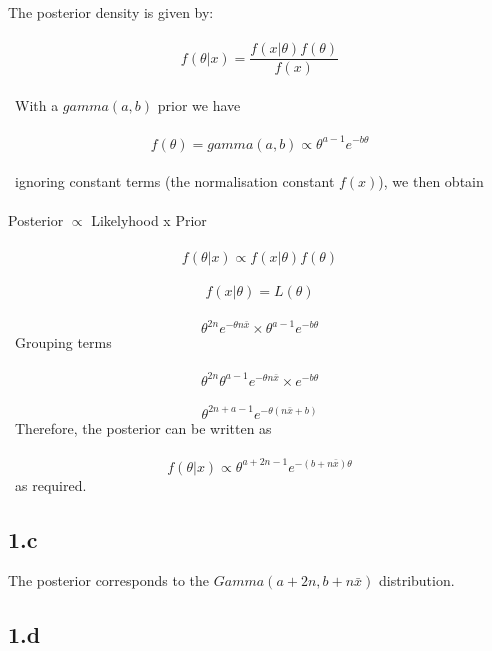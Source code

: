 \documentclass[11pt]{article}   	%
\begin{document}
The posterior density is given by: \\
\
\[ f( \theta | x ) = \frac { f( x | \theta ) f( \theta ) } { f(x) } \] \\
\
With a $ gamma(a, b) $ prior we have \\
\
\[ f( \theta) = gamma(a, b) \propto \theta^{ a - 1 } e^{ -b \theta } \] \\
\
ignoring constant terms (the normalisation constant $ f(x) $), we then obtain \\
\\
Posterior $ \propto $ Likelyhood x Prior \\
\\
\[ f( \theta | x ) \propto f( x | \theta ) f( \theta ) \]
\
\[ f(x | \theta) = L(\theta) \]
\
\[ \theta^{2n} e^{-\theta n \bar{x} } \times  \theta^{ a - 1 } e^{ -b \theta } \]
\
Grouping terms \\
\
\[ \theta^{2n} \theta^{ a - 1 } e^{-\theta n \bar{x} } \times e^{ -b \theta } \]
\
\[ \theta^{2n + a - 1 } e^{-\theta ( n \bar{x} + b ) } \]
\
Therefore, the posterior can be written as \\
\
\[ f( \theta | x ) \propto \theta^{a+2n-1} e^{-(b+n \bar{x}) \theta } \]
\
as required. \\


\subsection*{1.c}

The posterior corresponds to the $ Gamma(a + 2n, b + n \bar{ x } ) $ distribution. \\


\subsection*{1.d}
\end{document}

